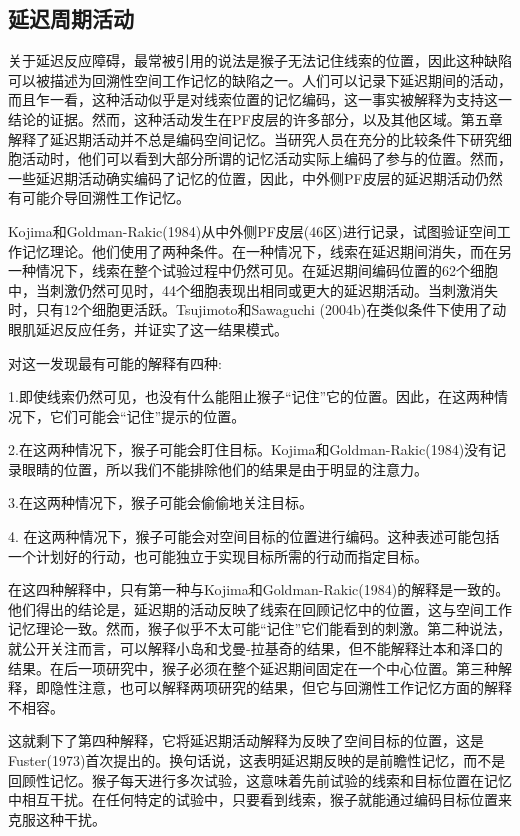\subsection{延迟周期活动}
关于延迟反应障碍，最常被引用的说法是猴子无法记住线索的位置，因此这种缺陷可以被描述为回溯性空间工作记忆的缺陷之一。人们可以记录下延迟期间的活动，而且乍一看，这种活动似乎是对线索位置的记忆编码，这一事实被解释为支持这一结论的证据。然而，这种活动发生在PF皮层的许多部分，以及其他区域。第五章解释了延迟期活动并不总是编码空间记忆。当研究人员在充分的比较条件下研究细胞活动时，他们可以看到大部分所谓的记忆活动实际上编码了参与的位置。然而，一些延迟期活动确实编码了记忆的位置，因此，中外侧PF皮层的延迟期活动仍然有可能介导回溯性工作记忆。

Kojima和Goldman-Rakic(1984)从中外侧PF皮层(46区)进行记录，试图验证空间工作记忆理论。他们使用了两种条件。在一种情况下，线索在延迟期间消失，而在另一种情况下，线索在整个试验过程中仍然可见。在延迟期间编码位置的62个细胞中，当刺激仍然可见时，44个细胞表现出相同或更大的延迟期活动。当刺激消失时，只有12个细胞更活跃。Tsujimoto和Sawaguchi (2004b)在类似条件下使用了动眼肌延迟反应任务，并证实了这一结果模式。

对这一发现最有可能的解释有四种:
\par
1.即使线索仍然可见，也没有什么能阻止猴子“记住”它的位置。因此，在这两种情况下，它们可能会“记住”提示的位置。
\par
2.在这两种情况下，猴子可能会盯住目标。Kojima和Goldman-Rakic(1984)没有记录眼睛的位置，所以我们不能排除他们的结果是由于明显的注意力。
\par
3.在这两种情况下，猴子可能会偷偷地关注目标。
\par
4. 在这两种情况下，猴子可能会对空间目标的位置进行编码。这种表述可能包括一个计划好的行动，也可能独立于实现目标所需的行动而指定目标。

在这四种解释中，只有第一种与Kojima和Goldman-Rakic(1984)的解释是一致的。他们得出的结论是，延迟期的活动反映了线索在回顾记忆中的位置，这与空间工作记忆理论一致。然而，猴子似乎不太可能“记住”它们能看到的刺激。第二种说法，就公开关注而言，可以解释小岛和戈曼-拉基奇的结果，但不能解释辻本和泽口的结果。在后一项研究中，猴子必须在整个延迟期间固定在一个中心位置。第三种解释，即隐性注意，也可以解释两项研究的结果，但它与回溯性工作记忆方面的解释不相容。

这就剩下了第四种解释，它将延迟期活动解释为反映了空间目标的位置，这是Fuster(1973)首次提出的。换句话说，这表明延迟期反映的是前瞻性记忆，而不是回顾性记忆。猴子每天进行多次试验，这意味着先前试验的线索和目标位置在记忆中相互干扰。在任何特定的试验中，只要看到线索，猴子就能通过编码目标位置来克服这种干扰。

